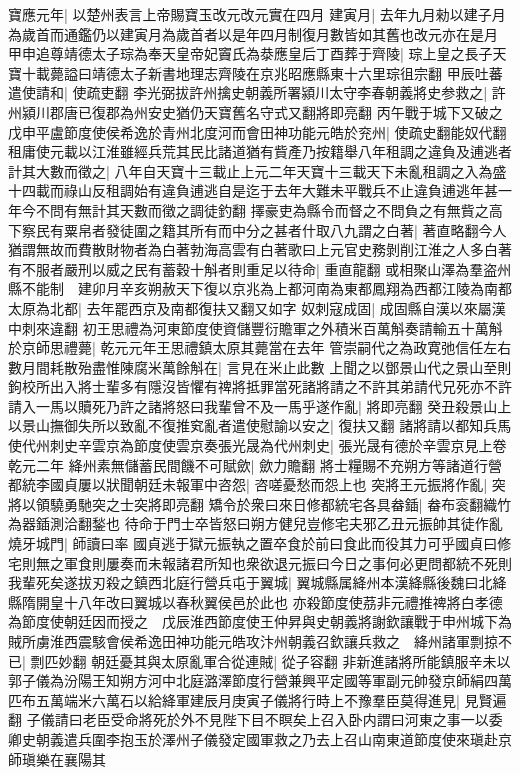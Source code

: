 寶應元年|{
	以楚州表言上帝賜寶玉改元改元實在四月}
建寅月|{
	去年九月勑以建子月為歲首而通鑑仍以建寅月為歲首者以是年四月制復月數皆如其舊也改元亦在是月}
甲申追尊靖德太子琮為奉天皇帝妃竇氏為㳟應皇后丁酉葬于齊陵|{
	琮上皇之長子天寶十載薨謚曰靖德太子新書地理志齊陵在京兆昭應縣東十六里琮徂宗翻}
甲辰吐蕃遣使請和|{
	使疏吏翻}
李光弼拔許州擒史朝義所署潁川太守李春朝義將史参救之|{
	許州潁川郡唐已復郡為州安史猶仍天寶舊名守式又翻將即亮翻}
丙午戰于城下又破之　戊申平盧節度使侯希逸於青州北度河而會田神功能元皓於兖州|{
	使疏史翻能奴代翻}
租庸使元載以江淮雖經兵荒其民比諸道猶有貲產乃按籍舉八年租調之違負及逋逃者計其大數而徵之|{
	八年自天寶十三載止上元二年天寶十三載天下未亂租調之入為盛十四載而祿山反租調始有違負逋逃自是迄于去年大難未平戰兵不止違負逋逃年甚一年今不問有無計其天數而徵之調徒釣翻}
擇豪吏為縣令而督之不問負之有無貲之高下察民有粟帛者發徒圍之籍其所有而中分之甚者什取八九謂之白著|{
	著直略翻今人猶謂無故而費散財物者為白著勃海高雲有白著歌曰上元官史務剝削江淮之人多白著}
有不服者嚴刑以威之民有蓄穀十斛者則重足以待命|{
	重直龍翻}
或相聚山澤為羣盗州縣不能制　建卯月辛亥朔赦天下復以京兆為上都河南為東都鳳翔為西都江陵為南都太原為北都|{
	去年罷西京及南都復扶又翻又如字}
奴刺寇成固|{
	成固縣自漢以來屬漢中刺來違翻}
初王思禮為河東節度使資儲豐衍贍軍之外積米百萬斛奏請輸五十萬斛於京師思禮薨|{
	乾元元年王思禮鎮太原其薨當在去年}
管崇嗣代之為政寛弛信任左右數月間耗散殆盡惟陳腐米萬餘斛在|{
	言見在米止此數}
上聞之以鄧景山代之景山至則鉤校所出入將士輩多有隱沒皆懼有禆將抵罪當死諸將請之不許其弟請代兄死亦不許請入一馬以贖死乃許之諸將怒曰我輩曾不及一馬乎遂作亂|{
	將即亮翻}
癸丑殺景山上以景山撫御失所以致亂不復推䆒亂者遣使慰諭以安之|{
	復扶又翻}
諸將請以都知兵馬使代州刺史辛雲京為節度使雲京奏張光晟為代州刺史|{
	張光晟有德於辛雲京見上卷乾元二年}
絳州素無儲蓄民間饑不可賦歛|{
	歛力贍翻}
將士糧賜不充朔方等諸道行營都統李國貞屢以狀聞朝廷未報軍中咨怨|{
	咨嗟憂愁而怨上也}
突將王元振將作亂|{
	突將以領驍勇馳突之士突將即亮翻}
矯令於衆曰來日修都統宅各具畚鍤|{
	畚布衮翻織竹為器鍤測洽翻鍫也}
待命于門士卒皆怒曰朔方健兒豈修宅夫邪乙丑元振帥其徒作亂燒牙城門|{
	師讀曰率}
國貞逃于獄元振執之置卒食於前曰食此而役其力可乎國貞曰修宅則無之軍食則屢奏而未報諸君所知也衆欲退元振曰今日之事何必更問都統不死則我輩死矣遂拔刃殺之鎮西北庭行營兵屯于翼城|{
	翼城縣属絳州本漢絳縣後魏曰北絳縣隋開皇十八年改曰翼城以春秋翼侯邑於此也}
亦殺節度使茘非元禮推禆將白孝德為節度使朝廷因而授之　戊辰淮西節度使王仲昇與史朝義將謝欽讓戰于申州城下為賊所虜淮西震駭會侯希逸田神功能元皓攻汴州朝義召欽讓兵救之　絳州諸軍剽掠不已|{
	剽匹妙翻}
朝廷憂其與太原亂軍合從連賊|{
	從子容翻}
非新進諸將所能鎮服辛未以郭子儀為汾陽王知朔方河中北庭潞澤節度行營兼興平定國等軍副元帥發京師絹四萬匹布五萬端米六萬石以給絳軍建辰月庚寅子儀將行時上不豫羣臣莫得進見|{
	見賢遍翻}
子儀請曰老臣受命將死於外不見陛下目不瞑矣上召入卧内謂曰河東之事一以委卿史朝義遣兵圍李抱玉於澤州子儀發定國軍救之乃去上召山南東道節度使來瑱赴京師瑱樂在襄陽其

